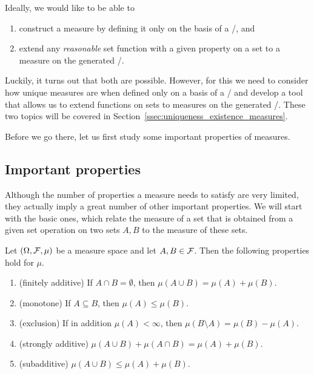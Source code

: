 Ideally, we would like to be able to
\begin{enumerate}
\item construct a measure by defining it only on the basis of a \sigalg/, and
\item extend any \emph{reasonable} set function with a given property on a set to a measure on the generated \sigalg/.
\end{enumerate}

Luckily, it turns out that both are possible. However, for this we need to consider how unique measures are when defined only on a basis of a \sigalg/ and develop a tool that allows us to extend functions on sets to measures on the generated \sigalg/. These two topics will be covered in Section~\ref{ssec:uniqueness_existence_measures}.

Before we go there, let us first study some important properties of measures.


\subsection{Important properties}

Although the number of properties a measure needs to satisfy are very limited, they actually imply a great number of other important properties. We will start with the basic ones, which relate the measure of a set that is obtained from a given set operation on two sets $A, B$ to the measure of these sets.

\begin{proposition}\label{prop:basic_properties_measures}
Let $(\Omega, \mathcal F, \mu)$ be a measure space and let $A, B \in \mathcal F$. Then the following properties hold for $\mu$.
\begin{enumerate}
\item (finitely additive) If $A \cap B = \emptyset$, then $\mu(A \cup B) = \mu(A) + \mu(B)$.
\item (monotone) If $A \subseteq B$, then $\mu(A) \le \mu(B)$.
\item (exclusion) If in addition $\mu(A) < \infty$, then $\mu(B \setminus A) = \mu(B) - \mu(A)$.
\item (strongly additive) $\mu(A \cup B) + \mu(A \cap B) = \mu(A) + \mu(B)$.
\item (subadditive) $\mu(A \cup B) \le \mu(A) + \mu(B)$.
\end{enumerate}
\end{proposition}


